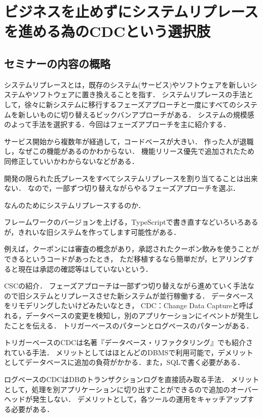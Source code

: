 \documentclass[titlepage,a4paper]{jsarticle}
\begin{document}
\section{ビジネスを止めずにシステムリプレースを進める為のCDCという選択肢} %
\subsection{セミナーの内容の概略}
システムリプレースとは，既存のシステム(サービス)やソフトウェアを新しいシステムやソフトウェアに置き換えることを指す．
システムリプレースの手法として，徐々に新システムに移行するフェーズアプローチと一度にすべてのシステムを新しいものに切り替えるビックバンアプローチがある．
システムの規模感のよって手法を選択する．今回はフェーズアプローチを主に紹介する．

サービス開始から複数年が経過して，コードベースが大きい．
作った人が退職し，なぜこの機能があるのかわからない．
機能リリース優先で追加されたため同修正していいかわからないなどがある．

開発の限られた氏プレースをすべてシステムリプレースを割り当てることは出来ない．
なので，一部ずつ切り替えながらやるフェーズアプローチを選ぶ．

なんのためにシステムリプレースするのか．

フレームワークのバージョンを上げる，TypeScriptで書き直すなどいろいろあるが，きれいな旧システムを作ってします可能性がある．

例えば，クーポンには審査の概念があり，承認されたクーポン飲みを使うことができるというコードがあったとき，
ただ移植するなら簡単だが，ヒアリングすると現在は承認の確認等はしていないという．

CSCの紹介．
フェーズアプローチは一部ずつ切り替えながら進めていく手法なので旧システムとリプレースさせた新システムが並行稼働する．
データベースをリモデリングしたいけどみたいなとき，
CDC：Change Data Captureと呼ばれる，データベースの変更を検知し，別のアプリケーションにイベントが発生したことを伝える．
トリガーベースのパターンとログベースのパターンがある．

トリガーベースのCDCは名著『データベース・リファクタリング』でも紹介されている手法．
メリットとしてはほとんどのDBMSで利用可能で，デメリットとしてデータベースに追加の負荷がかかる．また，SQLで書く必要がある．

ログベースのCDCはDBのトランザクションログを直接読み取る手法．
メリットとして，処理を別アプリケーションに切り出すことができるので追加のオーバーヘッドが発生しない．
デメリットとして，各ツールの運用をキャッチアップする必要がある．
\end{document}
